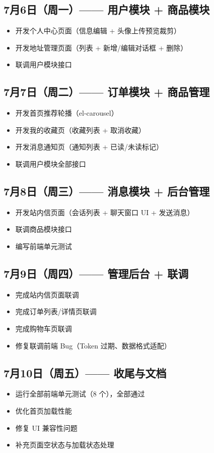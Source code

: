 \documentclass[12pt,a4paper]{ctexart}
\begin{document}
\subsection{7月6日（周一）—— 用户模块 + 商品模块}
\begin{itemize}
    \item 开发个人中心页面（信息编辑 + 头像上传预览裁剪）
    \item 开发地址管理页面（列表 + 新增/编辑对话框 + 删除）
    \item 联调用户模块接口
\end{itemize}

\subsection{7月7日（周二）—— 订单模块 + 商品管理}
\begin{itemize}
    \item 开发首页推荐轮播（el-carousel）
    \item 开发我的收藏页（收藏列表 + 取消收藏）
    \item 开发消息通知页（通知列表 + 已读/未读标记）
    \item 联调用户模块全部接口
\end{itemize}

\subsection{7月8日（周三）—— 消息模块 + 后台管理}
\begin{itemize}
    \item 开发站内信页面（会话列表 + 聊天窗口 UI + 发送消息）
    \item 联调商品模块接口
    \item 编写前端单元测试
\end{itemize}

\subsection{7月9日（周四）—— 管理后台 + 联调}
\begin{itemize}
    \item 完成站内信页面联调
    \item 完成订单列表/详情页联调
    \item 完成购物车页联调
    \item 修复联调前端 Bug（Token 过期、数据格式适配）
\end{itemize}

\subsection{7月10日（周五）—— 收尾与文档}
\begin{itemize}
    \item 运行全部前端单元测试（8 个），全部通过
    \item 优化首页加载性能
    \item 修复 UI 兼容性问题
    \item 补充页面空状态与加载状态处理
\end{itemize}
\end{document}
